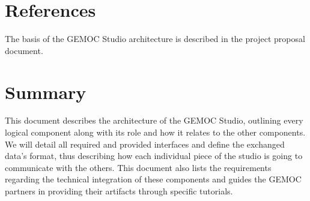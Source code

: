 \documentclass{gemoc} %
\begin{document}
\section{References}
The basis of the GEMOC Studio architecture is described in the project proposal document. 

\section{Summary}
This document describes the architecture of the GEMOC Studio, outlining every logical component along with its role and how it relates to the other components. We will detail all required and provided interfaces and define the exchanged data's format, thus describing how each individual piece of the studio is going to communicate with the others.
This document also lists the requirements regarding the technical integration of these components and guides the GEMOC partners in providing their artifacts through specific tutorials.


 
\end{document}
